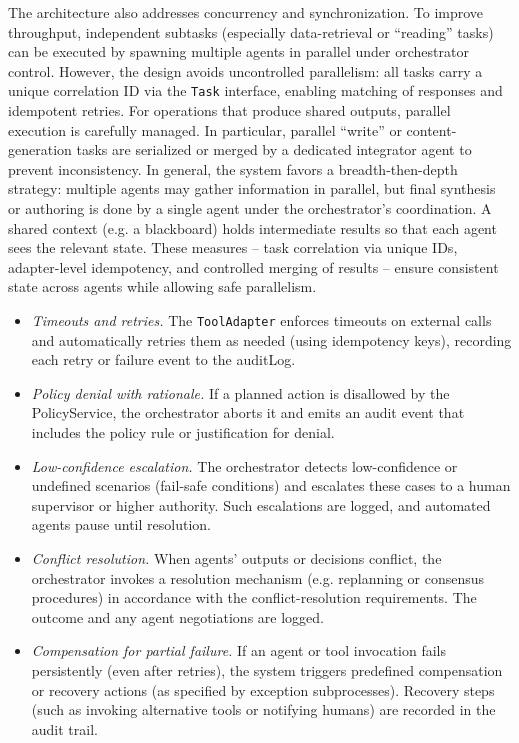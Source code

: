 \begin{figure}[t]
\label{fig:5.3-nominal}
\end{figure} The architecture also addresses concurrency and synchronization. To improve throughput, independent subtasks (especially data-retrieval or “reading” tasks) can be executed by spawning multiple agents in parallel under orchestrator control. However, the design avoids uncontrolled parallelism: all tasks carry a unique correlation ID via the \texttt{Task} interface, enabling matching of responses and idempotent retries. For operations that produce shared outputs, parallel execution is carefully managed. In particular, parallel “write” or content-generation tasks are serialized or merged by a dedicated integrator agent to prevent inconsistency. In general, the system favors a breadth-then-depth strategy: multiple agents may gather information in parallel, but final synthesis or authoring is done by a single agent under the orchestrator’s coordination. A shared context (e.g. a blackboard) holds intermediate results so that each agent sees the relevant state. These measures – task correlation via unique IDs, adapter-level idempotency, and controlled merging of results – ensure consistent state across agents while allowing safe parallelism. \begin{itemize}
\item \emph{Timeouts and retries.} The \texttt{ToolAdapter} enforces timeouts on external calls and automatically retries them as needed (using idempotency keys), recording each retry or failure event to the auditLog.
\item \emph{Policy denial with rationale.} If a planned action is disallowed by the PolicyService, the orchestrator aborts it and emits an audit event that includes the policy rule or justification for denial.
\item \emph{Low-confidence escalation.} The orchestrator detects low-confidence or undefined scenarios (fail-safe conditions) and escalates these cases to a human supervisor or higher authority. Such escalations are logged, and automated agents pause until resolution.
\item \emph{Conflict resolution.} When agents’ outputs or decisions conflict, the orchestrator invokes a resolution mechanism (e.g. replanning or consensus procedures) in accordance with the conflict-resolution requirements. The outcome and any agent negotiations are logged.
\item \emph{Compensation for partial failure.} If an agent or tool invocation fails persistently (even after retries), the system triggers predefined compensation or recovery actions (as specified by exception subprocesses). Recovery steps (such as invoking alternative tools or notifying humans) are recorded in the audit trail.

\end{itemize}
